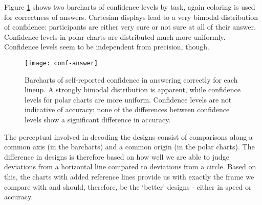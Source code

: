 Figure \ref{fig:conf} shows two barcharts of confidence levels by task, again coloring is used for correctness of answers. Cartesian displays lead to a very bimodal distribution of confidence: participants are either very sure or not sure at all of their answer. Confidence levels in polar charts are distributed much more uniformly. Confidence levels seem to be independent from precision, though.
\begin{figure}[hbtp] %
   \centering
   \texttt{[image: conf-answer]} 
\vspace{-0.2in}
   \caption{Barcharts of self-reported confidence in answering correctly for each lineup. A strongly bimodal distribution is apparent, while confidence levels for polar charts are more uniform. Confidence levels are not indicative of accuracy: none of the differences between confidence levels show a significant difference in accuracy.}
   \label{fig:conf}
\end{figure}

%

The perceptual involved in decoding the designs consist of comparisons along a common axis (in the barcharts) and a common origin (in the polar charts). The difference in designs is therefore based on how well we are able to judge deviations from a horizontal line compared to deviations from a circle. Based on this, the charts with added reference lines provide us with exactly the frame we compare with and should, therefore, be the `better' designs - either in speed or accuracy.


